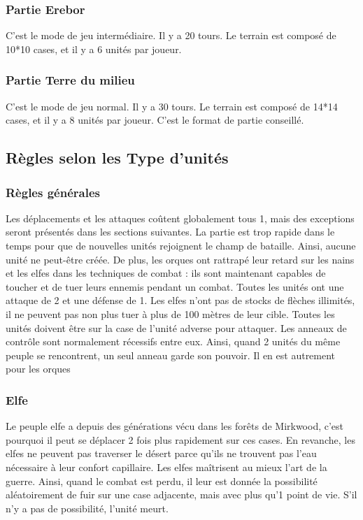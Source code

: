 \subsubsection{Partie Erebor}
C'est le mode de jeu intermédiaire. Il y a 20 tours. Le terrain est composé de 10*10 cases, et il y a 6 unités par joueur.
\subsubsection{Partie Terre du milieu}
C'est le mode de jeu normal. Il y a 30 tours. Le terrain est composé de 14*14 cases, et il y a 8 unités par joueur. C'est le format de partie conseillé.

\subsection{Règles selon les Type d'unités}
\subsubsection{Règles générales}
Les déplacements et les attaques coûtent globalement tous 1, mais des exceptions seront présentés dans les sections suivantes.
\newline
\newline
La partie est trop rapide dans le temps pour que de nouvelles unités rejoignent le champ de bataille. Ainsi, aucune unité ne peut-être créée.
\newline
 De plus, les orques ont rattrapé leur retard sur les nains et les elfes dans les techniques de combat : ils sont maintenant capables de toucher et de tuer leurs ennemis pendant un combat.
\newline
\newline
Toutes les unités ont une attaque de 2 et une défense de 1.
\newline
Les elfes n'ont pas de stocks de flèches illimités, il ne peuvent pas non plus tuer à plus de 100 mètres de leur cible. Toutes les unités doivent être sur la case de l'unité adverse pour attaquer.
\newline
Les anneaux de contrôle sont normalement récessifs entre eux. Ainsi, quand 2 unités du même peuple se rencontrent, un seul anneau garde son pouvoir. Il en est autrement pour les orques

\newpage
\subsubsection{Elfe}
Le peuple elfe a depuis des générations vécu dans les forêts de Mirkwood, c'est pourquoi il peut se déplacer 2 fois plus rapidement sur ces cases.
\newline
 En revanche, les elfes ne peuvent pas traverser le désert parce qu'ils ne trouvent pas l'eau nécessaire à leur confort capillaire.
\newline
\newline
Les elfes maîtrisent au mieux l'art de la guerre. Ainsi, quand le combat est perdu, il leur est donnée la possibilité aléatoirement de fuir sur une case adjacente, mais avec plus qu'1 point de vie.
\newline
  S'il n'y a pas de possibilité, l'unité meurt.

